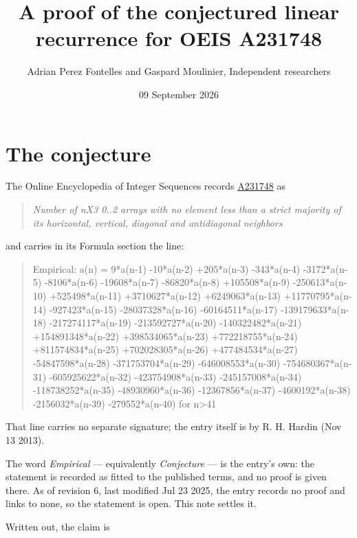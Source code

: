\documentclass[11pt]{article}
\title{A proof of the conjectured linear recurrence for OEIS A231748}
\author{Adrian Perez Fontelles and Gaspard Moulinier, Independent researchers}
\date{09 September 2026}
\theoremstyle{definition}
\begin{document}
\maketitle
\section{The conjecture}

The Online Encyclopedia of Integer Sequences records \href{https://oeis.org/A231748}{A231748} as

\begin{quote}\itshape Number of nX3 0..2 arrays with no element less than a strict majority of its horizontal, vertical, diagonal and antidiagonal neighbors\end{quote}

and carries in its Formula section the line:

\begin{quote}\ttfamily Empirical: a(n) = 9*a(n-1) -10*a(n-2) +205*a(n-3) -343*a(n-4) -3172*a(n-5) -8106*a(n-6) -19608*a(n-7) -86820*a(n-8) +105508*a(n-9) -250613*a(n-10) +525498*a(n-11) +3710627*a(n-12) +6249063*a(n-13) +11770795*a(n-14) -927423*a(n-15) -28037328*a(n-16) -60164511*a(n-17) -139179633*a(n-18) -217274117*a(n-19) -213592727*a(n-20) -140322482*a(n-21) +154891348*a(n-22) +398534065*a(n-23) +772218755*a(n-24) +811574834*a(n-25) +702028305*a(n-26) +477484534*a(n-27) -54847598*a(n-28) -371753704*a(n-29) -646008553*a(n-30) -754680367*a(n-31) -605925622*a(n-32) -423754908*a(n-33) -245157008*a(n-34) -118738252*a(n-35) -48930960*a(n-36) -12367856*a(n-37) -4600192*a(n-38) -2156032*a(n-39) -279552*a(n-40) for n>41\end{quote}

That line carries no separate signature; the entry itself is by R. H. Hardin (Nov 13 2013).

The word {\itshape Empirical} --- equivalently {\itshape Conjecture} --- is the entry's own: the statement is recorded as fitted to the published terms, and no proof is given there. As of revision 6, last modified Jul 23 2025, the entry records no proof and links to none, so the statement is open. This note settles it.

Written out, the claim is
\end{document}
